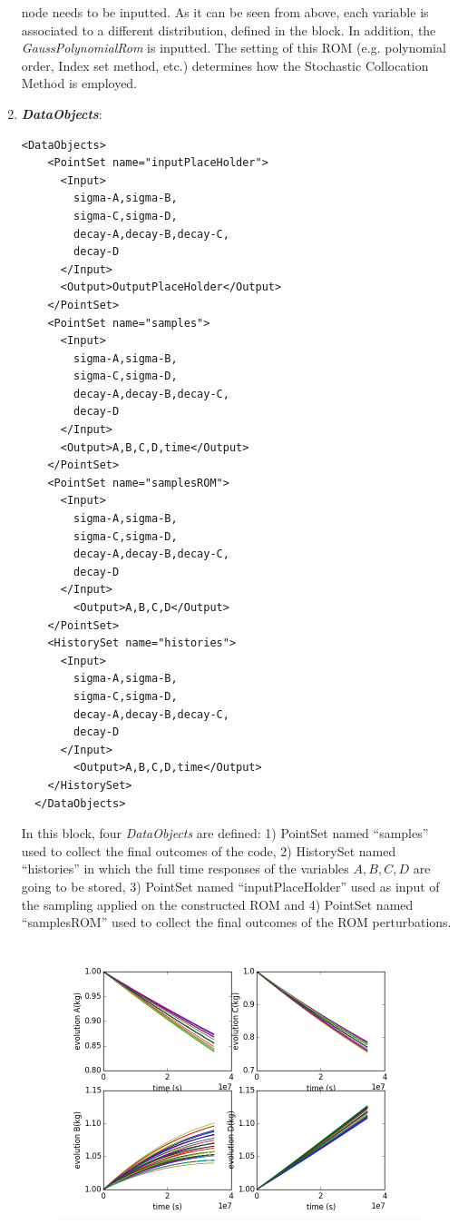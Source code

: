 \begin{enumerate}
   node needs to be inputted. 
  As it can be
  seen from above, each variable is associated to a different distribution,
  defined in the   block.
  In addition, the \textit{GaussPolynomialRom}   is inputted. The setting of this ROM (e.g. polynomial order, Index set method, etc.) determines how the Stochastic Collocation Method is 
  employed.
   \item \textbf{\textit{DataObjects}}:
\begin{lstlisting}[style=XML,morekeywords={arg,extension,pauseAtEnd,overwrite}]
  <DataObjects>
    <PointSet name="inputPlaceHolder">
      <Input>
        sigma-A,sigma-B,
        sigma-C,sigma-D,
        decay-A,decay-B,decay-C,
        decay-D
      </Input>
      <Output>OutputPlaceHolder</Output>
    </PointSet>
    <PointSet name="samples">
      <Input>
        sigma-A,sigma-B,
        sigma-C,sigma-D,
        decay-A,decay-B,decay-C,
        decay-D
      </Input>
      <Output>A,B,C,D,time</Output>
    </PointSet>
    <PointSet name="samplesROM">
      <Input>
        sigma-A,sigma-B,
        sigma-C,sigma-D,
        decay-A,decay-B,decay-C,
        decay-D
      </Input>
        <Output>A,B,C,D</Output>
    </PointSet>
    <HistorySet name="histories">
      <Input>
        sigma-A,sigma-B,
        sigma-C,sigma-D,
        decay-A,decay-B,decay-C,
        decay-D
      </Input>
        <Output>A,B,C,D,time</Output>
    </HistorySet>
  </DataObjects>
\end{lstlisting}
  In this block, four \textit{DataObjects} are defined: 1) PointSet named 
  ``samples'' used to collect the final outcomes of the code, 2) HistorySet named ``histories'' in which the full time responses of the variables $A,B,C,D$ are going to be stored, 3) PointSet named    
  ``inputPlaceHolder'' used as input of the sampling applied on the constructed ROM and 4) PointSet named ``samplesROM'' used to collect the final outcomes of the ROM perturbations.
 \begin{figure}[h!]
  \centering
  \includegraphics[scale=0.7]{pics/histories_SparseGrid.png}

\end{figure}
\end{enumerate}
